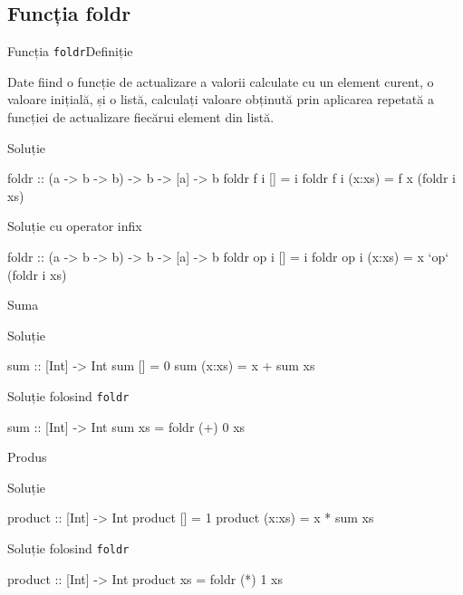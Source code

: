 \documentclass[handout,xcolor=pdftex,romanian,colorlinks]{beamer}
\begin{document}
\subsection{Funcția foldr}


\begin{frame}[fragile]{Funcția \lstinline$foldr$}{Definiție}
\begin{block}{}
Date fiind o funcție de actualizare a valorii calculate cu un element curent, o valoare inițială, și o listă, calculați valoare obținută prin aplicarea repetată a funcției de actualizare fiecărui element din listă.
\end{block}
\begin{block}{Soluție }
\begin{asciihs}
foldr :: (a -> b -> b) -> b -> [a] -> b
foldr f i []     = i
foldr f i (x:xs) = f x (foldr i xs)
\end{asciihs}
\end{block}

\begin{block}{Soluție  cu operator infix}
\begin{asciihs}
foldr :: (a -> b -> b) -> b -> [a] -> b
foldr op i []     = i
foldr op i (x:xs) = x `op` (foldr i xs)
\end{asciihs}
\end{block}
\end{frame}


\begin{frame}[fragile]{Suma}
\begin{block}{Soluție }
\begin{asciihs}
sum :: [Int] -> Int
sum []     = 0
sum (x:xs) = x + sum xs
\end{asciihs}
\end{block}
\begin{block}{Soluție folosind \lstinline$foldr$}
\begin{asciihs}
sum :: [Int] -> Int
sum xs = foldr (+) 0 xs
\end{asciihs}
\end{block}
\end{frame}

\begin{frame}[fragile]{Produs}
\begin{block}{Soluție }
\begin{asciihs}
product :: [Int] -> Int
product []     = 1
product (x:xs) = x * sum xs
\end{asciihs}
\end{block}
\begin{block}{Soluție folosind \lstinline$foldr$}
\begin{asciihs}
product :: [Int] -> Int
product xs = foldr (*) 1 xs
\end{asciihs}
\end{block}
\end{frame}
\end{document}
